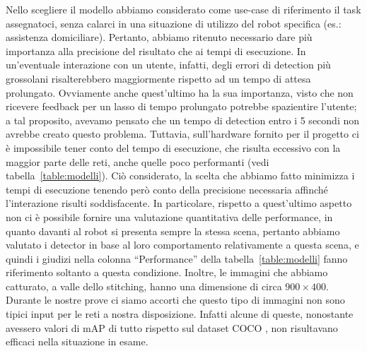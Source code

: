 Nello scegliere il modello abbiamo considerato come use-case di riferimento il task assegnatoci, senza calarci in una situazione di utilizzo del robot specifica (es.\@: assistenza domiciliare). Pertanto, abbiamo ritenuto necessario dare più importanza alla precisione del risultato che ai tempi di esecuzione. In un'eventuale interazione con un utente, infatti, degli errori di detection più grossolani risalterebbero maggiormente rispetto ad un tempo di attesa prolungato. Ovviamente anche quest'ultimo ha la sua importanza, visto che non ricevere feedback per un lasso di tempo prolungato potrebbe spazientire l'utente; a tal proposito, avevamo pensato che un tempo di detection entro i 5 secondi non avrebbe creato questo problema.
Tuttavia, sull'hardware fornito per il progetto ci è impossibile tener conto del tempo di esecuzione, che risulta eccessivo con la maggior parte delle reti, anche quelle poco performanti (vedi tabella~\ref{table:modelli}). Ciò considerato, la scelta che abbiamo fatto minimizza i tempi di esecuzione tenendo però conto della precisione necessaria affinché l'interazione risulti soddisfacente.
In particolare, rispetto a quest’ultimo aspetto non ci è possibile fornire una valutazione quantitativa delle performance, in quanto davanti al robot si presenta sempre la stessa scena, pertanto abbiamo valutato i detector in base al loro comportamento relativamente a questa scena, e quindi i giudizi nella colonna “Performance” della tabella~\ref{table:modelli} fanno riferimento soltanto a questa condizione. Inoltre, le immagini che abbiamo catturato, a valle dello stitching, hanno una dimensione di circa $900 \times 400$. Durante le nostre prove ci siamo accorti che questo tipo di immagini non sono tipici input per le reti a nostra disposizione. Infatti alcune di queste, nonostante avessero valori di mAP di tutto rispetto sul dataset COCO \cite{modelzoo}, non risultavano efficaci nella situazione in esame.

